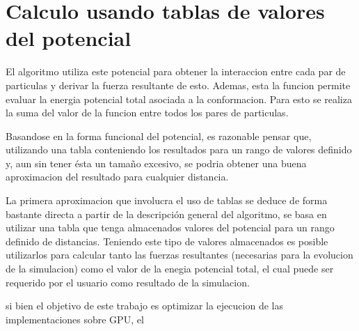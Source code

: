 \section{Calculo usando tablas de valores del potencial }

El algoritmo utiliza este potencial para obtener la interaccion entre cada par de particulas y derivar la fuerza resultante de esto. 
Ademas, esta la funcion permite evaluar la energia potencial total asociada a la conformacion. Para esto se realiza la suma del valor de la funcion entre todos los pares de particulas.


% 


Basandose en la forma funcional del potencial, es razonable pensar que, utilizando una tabla conteniendo los resultados para un rango de valores definido y, aun sin tener ésta un tamaño excesivo, se podria obtener una buena aproximacion del resultado para cualquier distancia. 
 

La primera aproximacion que involucra el uso de tablas se deduce de forma bastante directa a partir de la descripción general del algoritmo, se basa en utilizar una tabla que tenga almacenados valores del potencial para un rango definido de distancias.
Teniendo este tipo de valores almacenados es posible utilizarlos para calcular tanto las fuerzas resultantes (necesarias para la evolucion de la simulacion) como el valor de la enegia potencial total, el cual puede ser requerido por el usuario como resultado de la simulacion.


 
si bien el objetivo de este trabajo es optimizar la ejecucion de las implementaciones sobre GPU, el 



